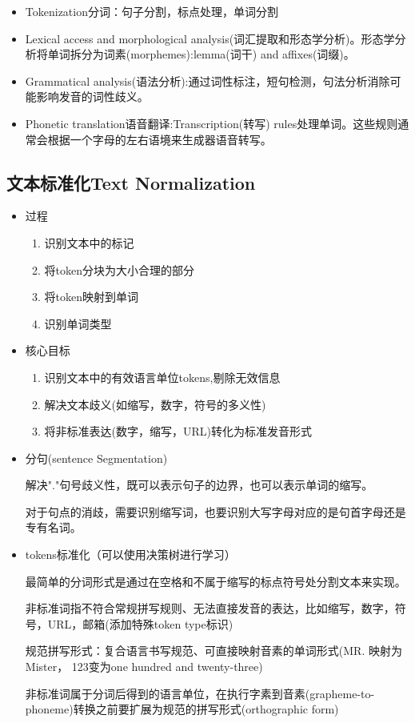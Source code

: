 \documentclass[UTF8]{ctexart}
\begin{document}
\begin{itemize}
    \item Tokenization分词：句子分割，标点处理，单词分割
    \item Lexical access and morphological analysis(词汇提取和形态学分析)。形态学分析将单词拆分为词素(morphemes):lemma(词干) and affixes(词缀)。
    \item Grammatical analysis(语法分析):通过词性标注，短句检测，句法分析消除可能影响发音的词性歧义。
    \item Phonetic translation语音翻译:Transcription(转写) rules处理单词。这些规则通常会根据一个字母的左右语境来生成器语音转写。
\end{itemize}

\subsection{文本标准化Text Normalization}


\begin{itemize}

    \item 过程
    \begin{enumerate}
        \item 识别文本中的标记
        \item 将token分块为大小合理的部分
        \item 将token映射到单词
        \item 识别单词类型
    \end{enumerate}
    \item 核心目标
    \begin{enumerate}
        \item 识别文本中的有效语言单位tokens,剔除无效信息
        \item 解决文本歧义(如缩写，数字，符号的多义性)
        \item 将非标准表达(数字，缩写，URL)转化为标准发音形式
    \end{enumerate}
    \item 分句(sentence Segmentation)
    
    解决"."句号歧义性，既可以表示句子的边界，也可以表示单词的缩写。

    对于句点的消歧，需要识别缩写词，也要识别大写字母对应的是句首字母还是专有名词。

    \item tokens标准化（可以使用决策树进行学习）
    
    最简单的分词形式是通过在空格和不属于缩写的标点符号处分割文本来实现。

    非标准词指不符合常规拼写规则、无法直接发音的表达，比如缩写，数字，符号，URL，邮箱(添加特殊token type标识)

    规范拼写形式：复合语言书写规范、可直接映射音素的单词形式(MR. 映射为Mister， 123变为one hundred and twenty-three)
    
    非标准词属于分词后得到的语言单位，在执行字素到音素(grapheme-to-phoneme)转换之前要扩展为规范的拼写形式(orthographic form)

\end{itemize}
\end{document}
